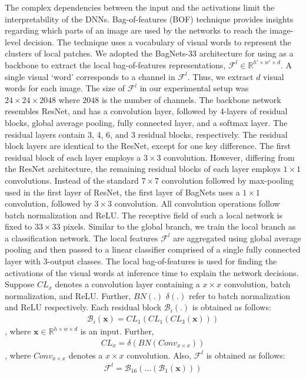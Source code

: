 \documentclass[twocolumn,final]{elsarticle}
\begin{document}
The complex dependencies between the input and the activations limit the interpretability of the DNNs. Bag-of-features (BOF) technique provides insights regarding which parts of an image are used by the networks to reach the image-level decision. The technique uses a vocabulary of visual words to represent the clusters of local patches. We adopted the BagNets-33 \citep{bagnets} architecture for using as a backbone to extract the local bag-of-features representations, $\mathcal{F}^l \in \mathbb{R}^{h'\times w' \times d}$. A single visual `word' corresponds to a channel in $\mathcal{F}^l$. Thus, we extract $d$ visual words for each image. The size of $\mathcal{F}^l$ in our experimental setup was $24\times 24\times 2048$ where $2048$ is the number of channels. The backbone network resembles ResNet, and has a convolution layer, followed by 4-layers of residual blocks, global average pooling, fully connected layer, and a softmax layer. The residual layers contain 3, 4, 6, and 3 residual blocks, respectively. The residual block layers are identical to the ResNet, except for one key difference. The first residual block of each layer employs a $3\times3$ convolution. However, differing from the ResNet architecture, the remaining residual blocks of each layer employs $1\times1$ convolutions. Instead of the standard $7\times7$ convolution followed by max-pooling used in the first layer of ResNet, the first layer of BagNets uses a $1\times1$ convolution, followed by $3\times3$ convolution. All convolution operations follow batch normalization and ReLU. The receptive field of such a local network is fixed to $33\times33$ pixels. Similar to the global branch, we train the local branch as a classification network. The local features $\mathcal{F}^l$ are aggregated using global average pooling and then passed to a linear classifier comprised of a single fully connected layer with 3-output classes. The local bag-of-features is used for finding the activations of the visual words at inference time to explain the network decisions. 
Suppose $CL_x$ denotes a convolution layer containing a $x\times x$ convolution, batch normalization, and ReLU. Further, $BN(.)$  $\delta(.)$ refer to batch normalization and ReLU respectively. Each residual block $\mathcal{B}_i(.)$ is obtained as follows:
\begin{align}
    \mathcal{B}_i(\mathbf{x}) = CL_1(CL_1(CL_3(\mathbf{x})))
\end{align}
, where $\mathbf{x} \in \mathbb{R}^{h\times w \times d}$ is an input. Further,
\begin{align}
    CL_x = \delta(BN(Conv_{x \times x}))
\end{align}
, where $Conv_{x\times x}$ denotes a $x\times x$ convolution. Also, $\mathcal{F}^l$ is obtained as follows:
\begin{align}
    \mathcal{F}^l = \mathcal{B}_{16}(\ldots (\mathcal{B}_1(\mathbf{x})))
\end{align}
\end{document}
